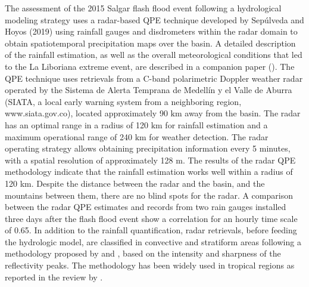 \documentclass[hess, manuscript]{copernicus}
\begin{document}
The assessment of the 2015 Salgar flash flood event following a hydrological modeling strategy uses a radar-based QPE technique developed by Sepúlveda and Hoyos (2019) using rainfall gauges and disdrometers within the radar domain to obtain spatiotemporal precipitation maps over the basin. A detailed description of the rainfall estimation, as well as the overall meteorological conditions that led to the La Liboriana extreme event, are described in a companion paper (\citet{Hoyos2019}). The QPE technique uses retrievals from a C-band polarimetric Doppler weather radar operated by the Sistema de Alerta Temprana de Medellín y el Valle de Aburra (SIATA, a local early warning system from a neighboring region, www.siata.gov.co), located approximately 90 $\text{km}$ away from the basin. The radar has an optimal range in a radius of 120 $\text{km}$ for rainfall estimation and a maximum operational range of 240 $\text{km}$ for weather detection. The radar operating strategy allows obtaining precipitation information every 5 minutes, with a spatial resolution of approximately 128 $\text{m}$. The results of the radar QPE methodology indicate that the rainfall estimation works well within a radius of 120 km. Despite the distance between the radar and the basin, and the mountains between them, there are no blind spots for the radar. A comparison between the radar QPE estimates and records from two rain gauges installed three days after the flash flood event show a correlation for an hourly time scale of 0.65. In addition to the rainfall quantification, radar retrievals, before feeding the hydrologic model, are classified in convective and stratiform areas following a methodology proposed by \citet{Yuter1997} and \citet{Steiner1995}, based on the intensity and sharpness of the reflectivity peaks. The methodology has been widely used in tropical regions as reported in the review by \citet{Houze2015}.\\
\end{document}
